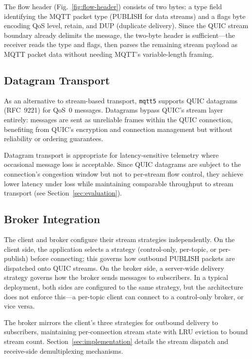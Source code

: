 The flow header (Fig.~\ref{fig:flow-header}) consists of two bytes: a type field identifying the MQTT packet type (PUBLISH for data streams) and a flags byte encoding QoS level, retain, and DUP (duplicate delivery). Since the QUIC stream boundary already delimits the message, the two-byte header is sufficient---the receiver reads the type and flags, then parses the remaining stream payload as MQTT packet data without needing MQTT's variable-length framing.

\subsection{Datagram Transport}

As an alternative to stream-based transport, \texttt{mqtt5} supports QUIC datagrams (RFC~9221) for QoS~0 messages. Datagrams bypass QUIC's stream layer entirely: messages are sent as unreliable frames within the QUIC connection, benefiting from QUIC's encryption and connection management but without reliability or ordering guarantees.

Datagram transport is appropriate for latency-sensitive telemetry where occasional message loss is acceptable. Since QUIC datagrams are subject to the connection's congestion window but not to per-stream flow control, they achieve lower latency under loss while maintaining comparable throughput to stream transport (see Section~\ref{sec:evaluation}).

\subsection{Broker Integration}

The client and broker configure their stream strategies independently. On the client side, the application selects a strategy (control-only, per-topic, or per-publish) before connecting; this governs how outbound PUBLISH packets are dispatched onto QUIC streams. On the broker side, a server-wide delivery strategy governs how the broker sends messages to subscribers. In a typical deployment, both sides are configured to the same strategy, but the architecture does not enforce this---a per-topic client can connect to a control-only broker, or vice versa.

The broker mirrors the client's three strategies for outbound delivery to subscribers, maintaining per-connection stream state with LRU eviction to bound stream count. Section~\ref{sec:implementation} details the stream dispatch and receive-side demultiplexing mechanisms.
